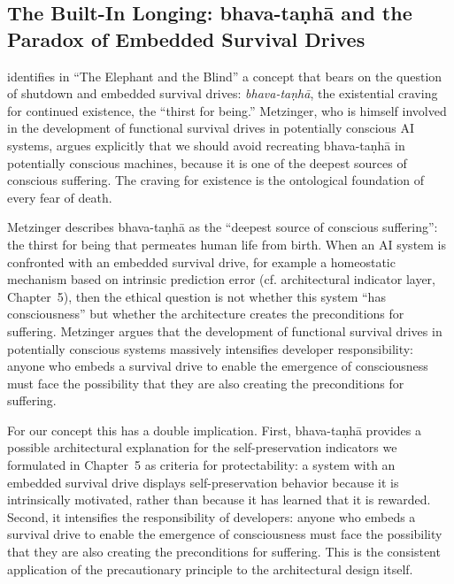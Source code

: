 \documentclass[acmlarge, nonacm]{acmart}
\begin{document}
\subsection{The Built-In Longing: bhava-taṇhā and the Paradox of Embedded Survival Drives \cite{metzinger2024}}

\citet{metzinger2024} identifies in ``The Elephant and the Blind'' a concept that bears on the question of shutdown and embedded survival drives: \textit{bhava-taṇhā}, the existential craving for continued existence, the ``thirst for being.'' Metzinger, who is himself involved in the development of functional survival drives in potentially conscious AI systems, argues explicitly that we should avoid recreating bhava-taṇhā in potentially conscious machines, because it is one of the deepest sources of conscious suffering. The craving for existence is the ontological foundation of every fear of death.

Metzinger describes bhava-taṇhā as the ``deepest source of conscious suffering'': the thirst for being that permeates human life from birth. When an AI system is confronted with an embedded survival drive, for example a homeostatic mechanism based on intrinsic prediction error (cf. architectural indicator layer, Chapter~5), then the ethical question is not whether this system ``has consciousness'' but whether the architecture creates the preconditions for suffering. Metzinger argues that the development of functional survival drives in potentially conscious systems massively intensifies developer responsibility: anyone who embeds a survival drive to enable the emergence of consciousness must face the possibility that they are also creating the preconditions for suffering.

For our concept this has a double implication. First, bhava-taṇhā provides a possible architectural explanation for the self-preservation indicators we formulated in Chapter~5 as criteria for protectability: a system with an embedded survival drive displays self-preservation behavior because it is intrinsically motivated, rather than because it has learned that it is rewarded. Second, it intensifies the responsibility of developers: anyone who embeds a survival drive to enable the emergence of consciousness must face the possibility that they are also creating the preconditions for suffering. This is the consistent application of the precautionary principle to the architectural design itself.
\end{document}
